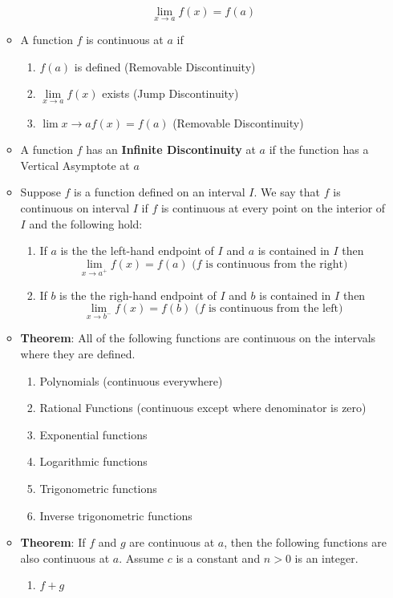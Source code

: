 \documentclass{article}
\begin{document}
\begin{itemize}
\begin{itemize}
		$$\lim_{x \to a}{f(x)} = f(a)$$
		\item A function $f$ is continuous at $a$ if
		\begin{enumerate}
			\item $f(a)$ is defined (Removable Discontinuity)
			\item $\lim\limits_{x \to a}{f(x)}$ exists (Jump Discontinuity)
			\item $\lim\limits{x \to a}{f(x)} = f(a)$ (Removable Discontinuity)
		\end{enumerate}
		\item A function $f$ has an \textbf{Infinite Discontinuity} at $a$ if the function has a Vertical Asymptote at $a$ \\
		\item Suppose $f$ is a function defined on an interval $I$. We say that $f$ is continuous on interval $I$ if $f$ is continuous at every point on the interior of $I$ and the following hold: \\
		\begin{enumerate}
			\item If $a$ is the the left-hand endpoint of $I$ and $a$ is contained in $I$ then
			$$\lim_{x \to a^+}{f(x)} = f(a) \text{ ($f$ is continuous from the right)}$$
			\item If $b$ is the the righ-hand endpoint of $I$ and $b$ is contained in $I$ then
			$$\lim_{x \to b^-}{f(x)} = f(b) \text{ ($f$ is continuous from the left)}$$
		\end{enumerate}
		\item \textbf{Theorem}: All of the following functions are continuous on the intervals where they are defined.
		\begin{enumerate}
			\item Polynomials (continuous everywhere)
			\item Rational Functions (continuous except where denominator is zero)
			\item Exponential functions
			\item Logarithmic functions
			\item Trigonometric functions
			\item Inverse trigonometric functions
		\end{enumerate}
		\item \textbf{Theorem}: If $f$ and $g$ are continuous at $a$, then the following functions are also continuous at $a$. Assume $c$ is a constant and $n > 0$ is an integer.
		\begin{enumerate}
			\item $f + g$

\end{enumerate}
\end{itemize}
\end{itemize}
\end{document}
